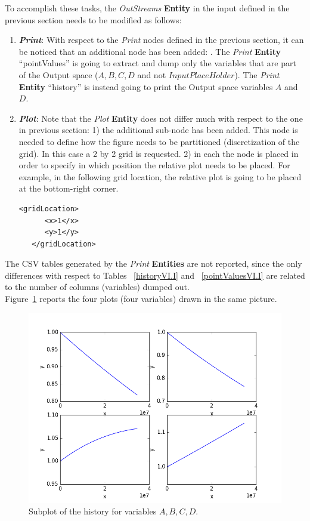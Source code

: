 To accomplish these tasks, the \textit{OutStreams} \textbf{Entity} in the input defined in the previous section needs to be modified as follows:
\begin{enumerate}
   \item \textbf{\textit{Print}}:
   With respect to the \textit{Print} nodes defined in the previous section, it can
   be noticed that an additional node has been added: . The \textit{Print} \textbf{Entity}
   ``pointValues'' is going to extract and dump only the variables that are part of the Output space
   ($A,B,C,D$ and not $InputPlaceHolder$).  The \textit{Print} \textbf{Entity} ``history'' is instead going to print
   the Output space variables $A$ and $D$.

   \item \textbf{\textit{Plot}}:
 Note that the  \textit{Plot} \textbf{Entity} does not differ much with respect to the one in
 previous section: 1) the additional sub-node   has been added.
 This node is needed to define how the figure needs to be partitioned (discretization of the grid). In this case
 a 2 by 2 grid is requested. 2) in each  the node  is placed in
 order to specify in which position the relative plot needs to be placed. For example, in the following grid
 location, the relative plot is going to be placed at the bottom-right corner.
  \begin{lstlisting}[style=XML,morekeywords={arg,extension,pauseAtEnd,overwrite}]
   <gridLocation>
      <x>1</x>
      <y>1</y>
   </gridLocation>
   \end{lstlisting}
 \end{enumerate}
The CSV tables generated by the \textit{Print} \textbf{Entities} are not reported, since the only differences with respect to Tables ~\ref{historyVI.I} and ~\ref{pointValuesVI.I} are related to the number of columns (variables)
dumped out.
\\Figure~\ref{fig:historySubPlotLine} reports the four plots (four variables) drawn in the same picture.
 \begin{figure}[h!]
  \centering
  \includegraphics[scale=0.7]{../../tests/framework/user_guide/SingleRuns/gold/subPlot/1-historyPlot_line-line-line-line.png}
  \caption{Subplot of the history for variables $A,B,C,D$.}
  \label{fig:historySubPlotLine}
 \end{figure}

